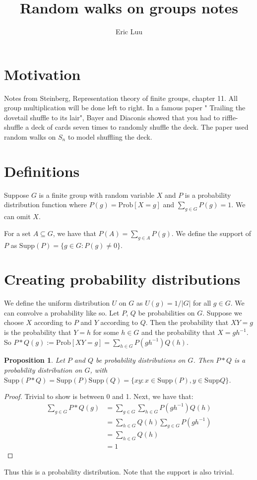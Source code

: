 \documentclass[]{article}
\title{Random walks on groups notes}
\author{Eric Luu}
\newtheorem{proposition}[theorem]{Proposition}
\theoremstyle{definition}
\numberwithin{theorem}{section}
\numberwithin{equation}{section}
\newcommand{\supp}{\text{Supp}}
\begin{document}
\maketitle
\section{Motivation}
Notes from Steinberg, Representation theory of finite groups, chapter 11. All group multiplication will be done left to right. 
In a famous paper " Trailing the dovetail shuffle to its lair", Bayer and Diaconis showed that you had to riffle-shuffle a deck of cards seven times to randomly shuffle the deck. The paper used random walks on $S_n$ to model shuffling the deck.

\section{Definitions}
Suppose $G$ is a finite group with random variable $X$ and $P$ is a probability distribution function where $P(g) = \text{Prob}[X = g]$ and $\sum_{g\in G} P(g) = 1$. We can omit $X$.

For a set $A \subseteq G$, we have that $P(A) = \sum_{g \in A} P(g)$. We define the support of $P$ as $\supp(P) = \lbrace g \in G : P(g) \neq 0 \rbrace$. 
\section{Creating probability distributions}
We define the uniform distribution $U$ on $G$ as $U(g) = 1/|G|$ for all $g \in G$. 
We can convolve a probability like so. Let $P$, $Q$ be probabilities on $G$. Suppose we choose $X$ according to $P$ and $Y$ according to $Q$. Then the probability that $XY = g$ is the probability that $Y = h$ for some $h \in G$ and the probability that $X = gh^{-1}$. 
So $P \ast Q(g) := \text{Prob}[XY = g] = \sum_{h\in G} P(gh^{-1})Q(h) $.

\begin{proposition}
	Let $P$ and $Q$ be probability distributions on $G$. Then $P \ast Q$ is a probability distribution on $G$, with $\supp(P \ast Q) = \supp(P)\supp(Q) = \lbrace xy : x \in \supp(P), y \in \supp Q \rbrace$. 
\end{proposition}
\begin{proof}
	Trivial to show is between 0 and 1.
	Next, we have that:
	\begin{align*}
		\sum_{g \in G} P \ast Q(g) &= \sum_{g \in G} \sum_{h \in G} P(gh^{-1}) Q(h)\\
		&=\sum_{h \in G} Q(h) \sum_{g \in G} P(gh^{-1})\\
		&= \sum_{h \in G} Q(h)\\
		&= 1
	\end{align*}
\end{proof}
Thus this is a probability distribution. Note that the support is also trivial.
\end{document}
